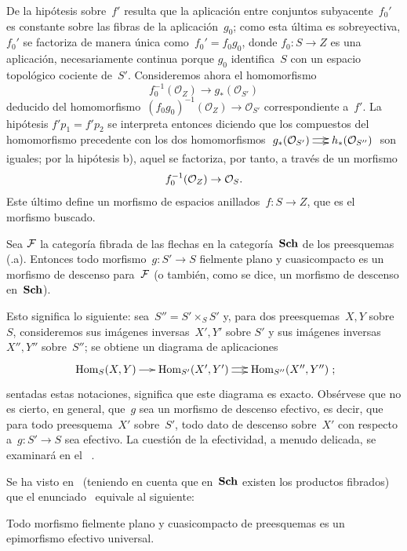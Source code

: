 De la hipótesis sobre~$f'$ resulta que la aplicación entre conjuntos
subyacente~$f_{0}'$ es constante sobre las fibras de la
aplicación~$g_{0}$; como esta última es sobreyectiva, $f_{0}'$ se
factoriza de manera única como~$f_{0}'=f_{0}g_{0}$, donde
$f_{0}\colon S\to Z$ es una aplicación, necesariamente continua porque
$g_{0}$ identifica~$S$ con un espacio topológico cociente de~$S'$.
Consideremos ahora el homomorfismo
$$
f_{0}^{-1}(\mathcal{O}_{Z})\to g_*(\mathcal{O}_{S'})
$$
deducido del homomorfismo~$(f_{0}g_{0})^{-1}(\mathcal{O}_{Z})\to
\mathcal{O}_{S'}$ correspondiente a~$f'$. La hipótesis
$f'p_{1}=f'p_{2}$ se interpreta entonces diciendo que los compuestos del
homomorfismo precedente con los dos homomorfismos
$\xymatrix@C=.5cm{g_*(\mathcal{O}_{S'})\ar@/^2pt/[r]\ar@/_2pt/[r] &
h_*(\mathcal{O}_{S''})}$ son iguales; por la hipótesis b), aquel se
factoriza, por tanto, a través de un morfismo
$$
f_{0}^{-1}(\mathcal{O}_{Z})\to \mathcal{O}_{S}\quoi.
$$
Este último define un morfismo de espacios anillados~$f\colon S\to Z$,
que es el morfismo buscado.

\begin{theoreme}
\label{VIII.5.2}
Sea $\cal{F}$ la categoría fibrada de las flechas en la categoría~$\Sch$
de los preesquemas \textup{(.a)}. Entonces todo
morfismo~$g\colon S'\to S$ fielmente plano y cuasicompacto es un morfismo
de descenso para~$\cal{F}$ (o también, como se dice, un morfismo de
descenso en~$\Sch$).
%
\end{theoreme}

Esto significa lo siguiente: sea~$S''=S'\times_{S}S'$ y, para dos
preesquemas~$X,Y$ sobre~$S$, consideremos sus imágenes inversas~$X',Y'$ sobre
$S'$ y sus imágenes inversas~$X'',Y''$ sobre~$S''$; se obtiene un diagrama
de aplicaciones
$$
\xymatrix@C=.5cm{\Hom_{S}(X,Y)\ar[r] &
\Hom_{S'}(X',Y')\ar@/^2pt/[r]\ar@/_2pt/[r] & \Hom_{S''}(X'',Y'')}\quoi;
$$
sentadas estas notaciones,  significa que este diagrama es
exacto. Obsérvese que
no es cierto, en general, que~$g$ sea un morfismo de descenso efectivo,
es decir, que para todo preesquema~$X'$ sobre~$S'$, todo dato de descenso
sobre~$X'$ con respecto a~$g\colon S'\to S$ sea efectivo. La cuestión de
la efectividad, a menudo delicada, se examinará en el
\No~.

Se ha visto en~\cite{VIII.D} (teniendo en cuenta que en~$\Sch$ existen los
productos fibrados) que el enunciado~ equivale al siguiente:

\begin{corollaire}
\label{VIII.5.3}
Todo morfismo fielmente plano y cuasicompacto de preesquemas es un
epimorfismo efectivo universal.
\end{corollaire}

